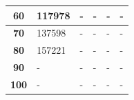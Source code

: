 \begin{table}[H]
\begin{tabular}{|c|l|l|l|l|l|}
\textbf{60}                                                                         & 117978                               & -                                     & -                                     & -                                     & -                                     \\ \hline
\textbf{70}                                                                         & 137598                               & -                                     & -                                     & -                                     & -                                     \\ \hline
\textbf{80}                                                                         & 157221                               & -                                     & -                                     & -                                     & -                                     \\ \hline
\textbf{90}                                                                         & -                                    & -                                     & -                                     & -                                     & -                                     \\ \hline
\textbf{100}                                                                        & -                                    & -                                     & -                                     & -                                     & -                                     \\ \hline
\end{tabular}
\end{table}


